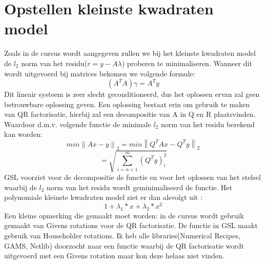 \documentclass[10pt,a4paper,twocolumn]{article}
\begin{document}
\section{Opstellen kleinste kwadraten model}
Zoals in de cursus wordt aangegeven zullen we bij het kleinste kwadraten model de $l_{2}$ norm van het residu($r = y - A\lambda$) proberen te minimaliseren. Wanneer dit wordt uitgevoerd bij matrices bekomen we volgende formule:
$$(A^{T}A)\gamma = A^{T}y$$
Dit lineair systeem is zeer slecht geconditioneerd, dus het oplossen ervan zal geen betrouwbare oplossing geven. Een oplossing bestaat erin om gebruik te maken van QR factorisatie, hierbij zal een decompositie van A in Q en R plaatsvinden. Waardoor d.m.v. volgende functie de minimale $l_{2}$ norm van het residu berekend kan worden:
$$min \left \| Ax -y \right \|_{2} = min\left \|Q^{T}Ax -Q^{T}y  \right \|_{2} $$
$$= \sqrt{\sum_{i=n+1}^{m}(Q^{T}y)_{i}^{2}}$$
GSL voorziet voor de decompositie de \texttt{} functie en voor het oplossen van het stelsel waarbij de $l_{2}$ norm van het residu wordt geminimaliseerd de \texttt{} functie. Het polynomiale kleinste kwadraten model ziet er dan alsvolgt uit :
$$1 + \lambda_{1} *x +\lambda_{2}* x^{2}$$
Een kleine opmerking die gemaakt moet worden: in de cursus wordt gebruik gemaakt van Givens rotations voor de QR factorisatie. De functie \texttt{} in GSL maakt gebruik van Householder rotations. Ik heb alle libraries(Numerical Recipes, GAMS, Netlib) doorzocht naar een functie waarbij de QR factorisatie wordt uitgevoerd met een Givens rotation maar kon deze helaas niet vinden.
\end{document}
